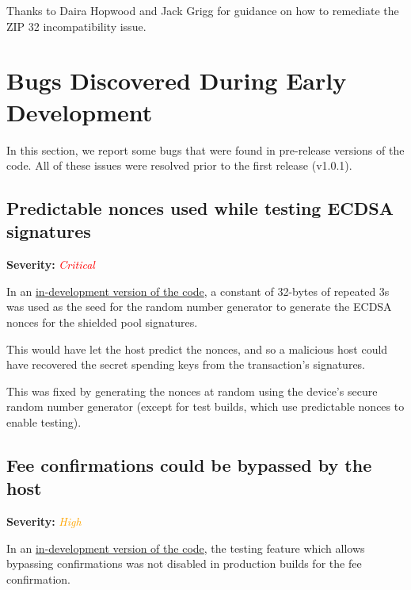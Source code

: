 \documentclass[10pt,titlepage]{article}
\newcommand{\CriticalIssue}{\textcolor{red}{\emph{Critical}}}
\newcommand{\HighIssue}{\textcolor{orange}{\emph{High}}}
\begin{document}
Thanks to Daira Hopwood and Jack Grigg for guidance on how to remediate the ZIP
32 incompatibility issue.

\nocite{*}




\pagebreak

\appendix
 
\renewcommand{\thesubsection}{\thesection.\arabic{subsection}}
\section{Bugs Discovered During Early Development} \label{appendixdevbugs}

In this section, we report some bugs that were found in pre-release versions of
the code. All of these issues were resolved prior to the first release (v1.0.1).

\subsection{Predictable nonces used while testing ECDSA signatures} \label{issueconstantnonce}
\textbf{Severity:} \CriticalIssue

In an \href{https://github.com/hhanh00/zcash-ledger/blob/7bcb456e32691acb2a2ea143c89e59a3d0b6f814/src/crypto/tx.c#L86}{in-development version of the code}, a constant of 32-bytes of repeated 3s was
used as the seed for the random number generator to generate the ECDSA nonces
for the shielded pool signatures.

This would have let the host predict the nonces, and so a malicious host could
have recovered the secret spending keys from the transaction's signatures.

This was fixed by generating the nonces at random using the device's secure
random number generator (except for test builds, which use predictable nonces to
enable testing).

\subsection{Fee confirmations could be bypassed by the host} \label{issueconfbypass}
\textbf{Severity:} \HighIssue

In an
\href{https://github.com/hhanh00/zcash-ledger/blob/6966e44d6ce9e2366eaeafcc6ccb18503f646347/src/crypto/tx.c#L375-L378}{in-development
version of the code}, the testing feature which allows bypassing confirmations
was not disabled in production builds for the fee confirmation.
\end{document}
